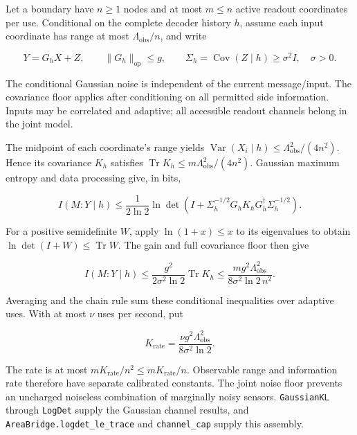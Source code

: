 \documentclass[
]{article}
\begin{document}
Let a boundary have \(n\ge1\) nodes and at most \(m\le n\) active
readout coordinates per use. Conditional on the complete decoder history
\(h\), assume each input coordinate has range at most
\(\Lambda_{\mathrm{obs}}/n\), and write

\[
Y=G_hX+Z,\qquad
\|G_h\|_{\mathrm{op}}\le g,\qquad
\Sigma_h=\operatorname{Cov}(Z\mid h)\ge\sigma^2I,\quad\sigma>0.
\]

The conditional Gaussian noise is independent of the current
message/input. The covariance floor applies after conditioning on all
permitted side information. Inputs may be correlated and adaptive; all
accessible readout channels belong in the joint model.

The midpoint of each coordinate's range yields
\(\operatorname{Var}(X_i\mid h)\le\Lambda_{\mathrm{obs}}^2/(4n^2)\).
Hence its covariance \(K_h\) satisfies
\(\operatorname{Tr}K_h\le m\Lambda_{\mathrm{obs}}^2/(4n^2)\). Gaussian
maximum entropy and data processing give, in bits,

\[
I(M:Y\mid h)\le\frac1{2\ln2}
\ln\det\!\left(I+\Sigma_h^{-1/2}G_hK_hG_h^\dagger\Sigma_h^{-1/2}\right).
\]

For a positive semidefinite \(W\), apply \(\ln(1+x)\le x\) to its
eigenvalues to obtain \(\ln\det(I+W)\le\operatorname{Tr}W\). The gain
and full covariance floor then give

\[
I(M:Y\mid h)\le
\frac{g^2}{2\sigma^2\ln2}\operatorname{Tr}K_h
\le \frac{m g^2\Lambda_{\mathrm{obs}}^2}{8\sigma^2\ln2\,n^2}.
\]

Averaging and the chain rule sum these conditional inequalities over
adaptive uses. With at most \(\nu\) uses per second, put

\[
K_{\mathrm{rate}}=\frac{\nu g^2\Lambda_{\mathrm{obs}}^2}{8\sigma^2\ln2}.
\]

The rate is at most \(mK_{\mathrm{rate}}/n^2\le mK_{\mathrm{rate}}/n\).
Observable range and information rate therefore have separate calibrated
constants. The joint noise floor prevents an uncharged noiseless
combination of marginally noisy sensors. \texttt{GaussianKL} through
\texttt{LogDet} supply the Gaussian channel results, and
\texttt{A\allowbreak{}r\allowbreak{}e\allowbreak{}a\allowbreak{}B\allowbreak{}r\allowbreak{}i\allowbreak{}d\allowbreak{}g\allowbreak{}e\allowbreak{}.\allowbreak{}l\allowbreak{}o\allowbreak{}g\allowbreak{}d\allowbreak{}e\allowbreak{}t\allowbreak{}\_\allowbreak{}l\allowbreak{}e\allowbreak{}\_\allowbreak{}t\allowbreak{}r\allowbreak{}a\allowbreak{}c\allowbreak{}e}
and \texttt{channel\_cap} supply this assembly.
\end{document}
